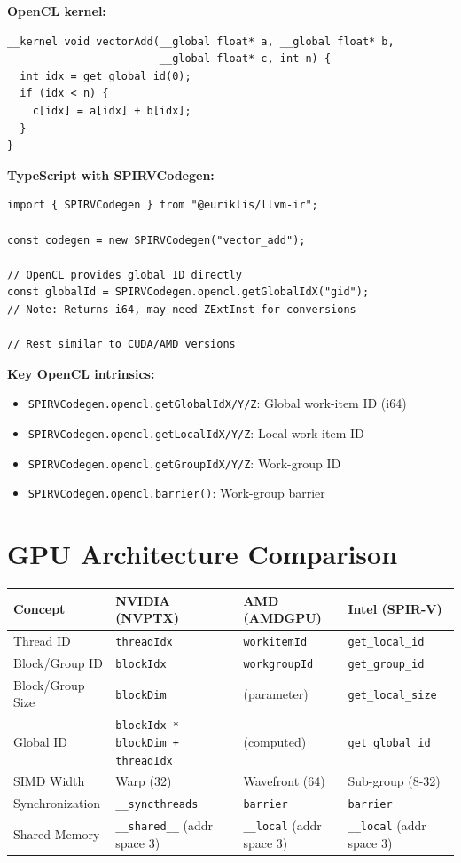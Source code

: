 \documentclass[11pt,oneside]{book}
\begin{document}
\textbf{OpenCL kernel:}
\begin{lstlisting}[style=ir]
__kernel void vectorAdd(__global float* a, __global float* b,
                        __global float* c, int n) {
  int idx = get_global_id(0);
  if (idx < n) {
    c[idx] = a[idx] + b[idx];
  }
}
\end{lstlisting}

\textbf{TypeScript with SPIRVCodegen:}
\begin{lstlisting}[style=ts]
import { SPIRVCodegen } from "@euriklis/llvm-ir";

const codegen = new SPIRVCodegen("vector_add");

// OpenCL provides global ID directly
const globalId = SPIRVCodegen.opencl.getGlobalIdX("gid");
// Note: Returns i64, may need ZExtInst for conversions

// Rest similar to CUDA/AMD versions
\end{lstlisting}

\textbf{Key OpenCL intrinsics:}
\begin{itemize}[noitemsep]
  \item \texttt{SPIRVCodegen.opencl.getGlobalIdX/Y/Z}: Global work-item ID (i64)
  \item \texttt{SPIRVCodegen.opencl.getLocalIdX/Y/Z}: Local work-item ID
  \item \texttt{SPIRVCodegen.opencl.getGroupIdX/Y/Z}: Work-group ID
  \item \texttt{SPIRVCodegen.opencl.barrier()}: Work-group barrier
\end{itemize}

\section{GPU Architecture Comparison}

\begin{longtable}{|p{3cm}|p{3.5cm}|p{3.5cm}|p{3.5cm}|}
\hline
\textbf{Concept} & \textbf{NVIDIA (NVPTX)} & \textbf{AMD (AMDGPU)} & \textbf{Intel (SPIR-V)} \\
\hline
Thread ID & \texttt{threadIdx} & \texttt{workitemId} & \texttt{get\_local\_id} \\
\hline
Block/Group ID & \texttt{blockIdx} & \texttt{workgroupId} & \texttt{get\_group\_id} \\
\hline
Block/Group Size & \texttt{blockDim} & (parameter) & \texttt{get\_local\_size} \\
\hline
Global ID & \texttt{blockIdx * blockDim + threadIdx} & (computed) & \texttt{get\_global\_id} \\
\hline
SIMD Width & Warp (32) & Wavefront (64) & Sub-group (8-32) \\
\hline
Synchronization & \texttt{\_\_syncthreads} & \texttt{barrier} & \texttt{barrier} \\
\hline
Shared Memory & \texttt{\_\_shared\_\_} (addr space 3) & \texttt{\_\_local} (addr space 3) & \texttt{\_\_local} (addr space 3) \\
\hline
\end{longtable}
\end{document}
